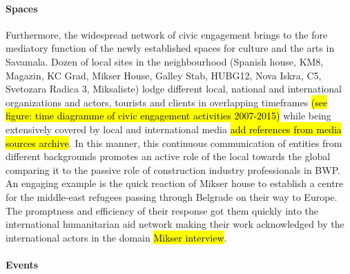 \documentclass[11pt]{report}
\begin{document}
\paragraph{Spaces}

Furthermore, the widespread network of civic engagement brings to the fore mediatory function of the newly established spaces for culture and the arts in Savamala. Dozen of local sites in the neighbourhood
(Spanish house, KM8, Magazin, KC Grad, Mikser House, Galley Stab, HUBG12, Nova Iskra, C5, Svetozara Radica 3, Miksaliste) lodge different local, national and international organizations and actors, tourists and clients in overlapping timeframes
\hl{(see figure: time diagramme of civic engagement activities 2007-2015)}
while being extensively covered by local and international media
\hl{add references from media sources archive}.
In this manner, this continuous communication of entities from different backgrounds promotes an active role of the local towards the global comparing it to the passive role of construction industry professionals in BWP.
An engaging example is the quick reaction of Mikser house to establish a centre for the middle-east refugees passing through Belgrade on their way to Europe. The promptness and efficiency of their response got them quickly into the international humanitarian aid network making their work acknowledged by the international actors in the domain
\hl{Mikser interview}.

\paragraph{Events}
\end{document}
